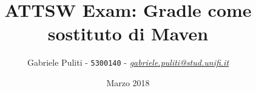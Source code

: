 \documentclass{article}
\title{ATTSW Exam: Gradle come sostituto di Maven}
\author{Gabriele Puliti - \texttt{5300140} - \href{mailto:gabriele.puliti@stud.unifi.it}{\textit{gabriele.puliti@stud.unifi.it}}}
\date{Marzo 2018}
\begin{document}
\maketitle

\newpage
\tableofcontents
\newpage

\begin{flushleft}


\newpage


\newpage

\newpage


\end{flushleft}
\end{document}
